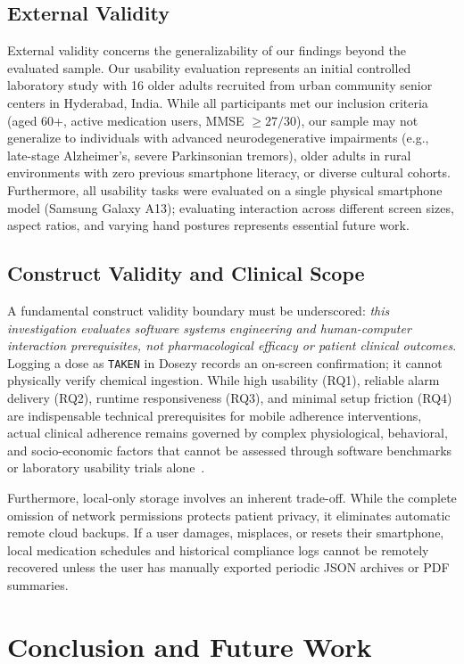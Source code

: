\documentclass[11pt,a4paper]{article}
\begin{document}
\subsection{External Validity}
External validity concerns the generalizability of our findings beyond the evaluated sample. Our usability evaluation represents an initial controlled laboratory study with 16 older adults recruited from urban community senior centers in Hyderabad, India. While all participants met our inclusion criteria (aged 60+, active medication users, MMSE $\ge 27/30$), our sample may not generalize to individuals with advanced neurodegenerative impairments (e.g., late-stage Alzheimer's, severe Parkinsonian tremors), older adults in rural environments with zero previous smartphone literacy, or diverse cultural cohorts. Furthermore, all usability tasks were evaluated on a single physical smartphone model (Samsung Galaxy A13); evaluating interaction across different screen sizes, aspect ratios, and varying hand postures represents essential future work.

\subsection{Construct Validity and Clinical Scope}
A fundamental construct validity boundary must be underscored: \emph{this investigation evaluates software systems engineering and human-computer interaction prerequisites, not pharmacological efficacy or patient clinical outcomes}. Logging a dose as \texttt{TAKEN} in Dosezy records an on-screen confirmation; it cannot physically verify chemical ingestion. While high usability (RQ1), reliable alarm delivery (RQ2), runtime responsiveness (RQ3), and minimal setup friction (RQ4) are indispensable technical prerequisites for mobile adherence interventions, actual clinical adherence remains governed by complex physiological, behavioral, and socio-economic factors that cannot be assessed through software benchmarks or laboratory usability trials alone~\cite{who2003adherence,haynes2002helping}.

Furthermore, local-only storage involves an inherent trade-off. While the complete omission of network permissions protects patient privacy, it eliminates automatic remote cloud backups. If a user damages, misplaces, or resets their smartphone, local medication schedules and historical compliance logs cannot be remotely recovered unless the user has manually exported periodic JSON archives or PDF summaries.

\section{Conclusion and Future Work}
\label{sec:conclusion}
\end{document}
